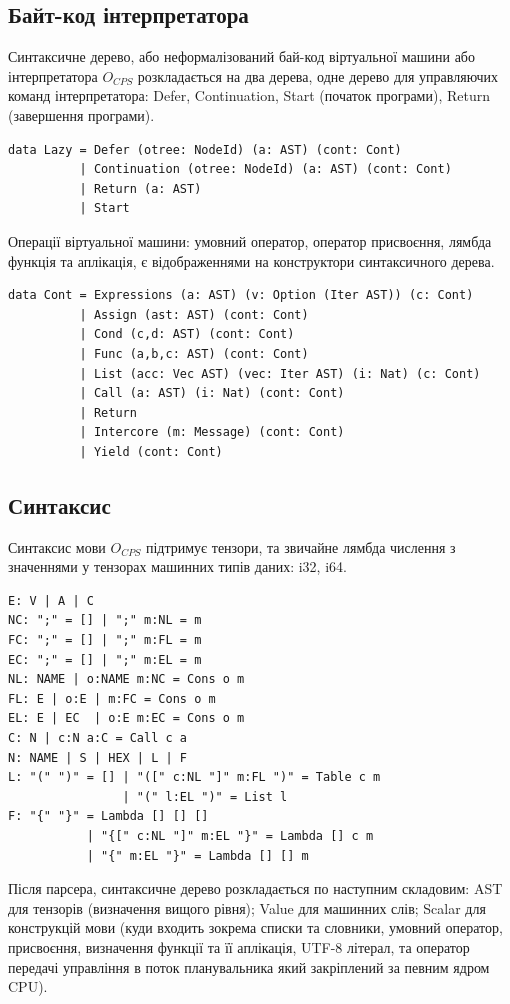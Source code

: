 \subsection{Байт-код інтерпретатора}
Синтаксичне дерево, або неформалізований бай-код віртуальної
машини або інтерпретатора $O_{CPS}$ розкладається на два дерева, одне дерево
для управляючих команд інтерпретатора: Defer, Continuation, Start (початок програми),
Return (завершення програми).

\begin{lstlisting}
data Lazy = Defer (otree: NodeId) (a: AST) (cont: Cont)
          | Continuation (otree: NodeId) (a: AST) (cont: Cont)
          | Return (a: AST)
          | Start
\end{lstlisting}

Операції віртуальної машини: умовний оператор, оператор присвоєння, лямбда
функція та аплікація, є відображеннями на конструктори синтаксичного дерева.

\begin{lstlisting}
data Cont = Expressions (a: AST) (v: Option (Iter AST)) (c: Cont)
          | Assign (ast: AST) (cont: Cont)
          | Cond (c,d: AST) (cont: Cont)
          | Func (a,b,c: AST) (cont: Cont)
          | List (acc: Vec AST) (vec: Iter AST) (i: Nat) (c: Cont)
          | Call (a: AST) (i: Nat) (cont: Cont)
          | Return
          | Intercore (m: Message) (cont: Cont)
          | Yield (cont: Cont)
\end{lstlisting}

\newpage
\subsection{Синтаксис}
Синтаксис мови $O_{CPS}$ підтримує тензори, та звичайне лямбда числення
з значеннями у тензорах машинних типів даних: i32, i64.

\begin{lstlisting}[mathescape=true]
E: V | A | C
NC: ";" = [] | ";" m:NL = m
FC: ";" = [] | ";" m:FL = m
EC: ";" = [] | ";" m:EL = m
NL: NAME | o:NAME m:NC = Cons o m
FL: E | o:E | m:FC = Cons o m
EL: E | EC  | o:E m:EC = Cons o m
C: N | c:N a:C = Call c a
N: NAME | S | HEX | L | F
L: "(" ")" = [] | "([" c:NL "]" m:FL ")" = Table c m
                | "(" l:EL ")" = List l
F: "{" "}" = Lambda [] [] []
           | "{[" c:NL "]" m:EL "}" = Lambda [] c m
           | "{" m:EL "}" = Lambda [] [] m
\end{lstlisting}

Після парсера, синтаксичне дерево розкладається по наступним складовим: AST для
тензорів (визначення вищого рівня); Value для машинних слів; Scalar для
конструкцій мови (куди входить зокрема списки та словники, умовний оператор,
присвоєння, визначення функції та її аплікація, UTF-8 літерал, та оператор
передачі управління в поток планувальника який закріплений за певним ядром CPU).

